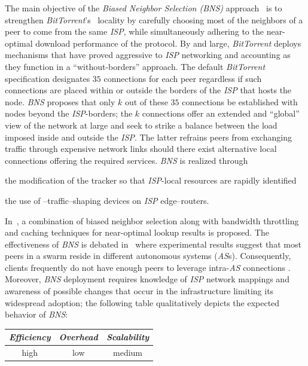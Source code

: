 The main objective of the \emph{Biased Neighbor Selection (BNS)} 
approach~\cite{BCCMSBZ2006} is to 
strengthen {\sl BitTorrent}'s~\cite{c_bittorrent_2003} locality 
by carefully choosing most of the neighbors of a peer to come from 
the same \emph{ISP}, while simultaneously adhering to the near-optimal
download performance of the protocol.
By and large, {\sl BitTorrent} deploys mechanisms that have proved
aggressive to \emph{ISP} networking and accounting as they function 
in a ``without-borders'' approach. 
The default {\sl BitTorrent} specification
designates $35$ connections for each peer regardless if such connections are
placed within or outside the borders of the \emph{ISP} that hosts the node.
\emph{BNS} proposes that only $k$ out of these $35$ connections be
established with nodes beyond the {\it ISP}-borders;
the $k$ connections offer an extended and ``global'' view of 
the network at large and seek to strike a balance between 
the load imposed inside and outside the \emph{ISP}.
The latter refrains peers from exchanging traffic through
expensive network links should there exist alternative local connections
offering the required services. 
\emph{BNS} is realized through 
\begin{inparaenum}[1)]
\item
the modification of the tracker so that 
\emph{ISP}-local resources are rapidly identified
\item
the use of \p--traffic--shaping devices on \emph{ISP} edge--routers. 
\end{inparaenum}
In~\cite{BCCMSBZ2006}, a combination of 
biased neighbor selection along with bandwidth throttling
and caching techniques for near-optimal lookup results is proposed. 
The effectiveness of \emph{BNS} is debated 
in~\cite{RTLCGZ2010} where experimental results suggest that 
most peers in a swarm reside in different autonomous systems (\emph{AS}s).
Consequently, clients frequently do not have enough peers to leverage
intra-\emph{AS} connections \cite{RTLCGZ2010}.
Moreover, \emph{BNS} deployment
requires knowledge of \emph{ISP} network mappings and awareness of possible
changes that occur in the infrastructure limiting its widespread adoption; the
following table qualitatively depicts the expected behavior of \emph{BNS}:
\begin{center}
{\footnotesize
\begin{tabular}{ccc}
\emph{Efficiency} & \emph{Overhead} & \emph{Scalability} \\
\hline
high &
low &
medium
\end{tabular}
}
\end{center}

